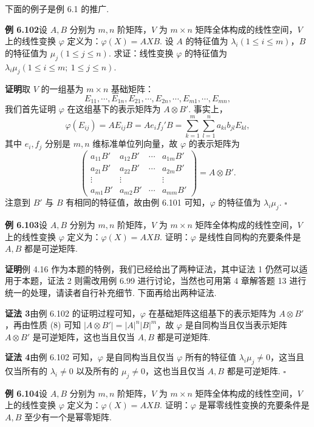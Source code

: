\documentclass[UTF8, 12pt, fontset=fandol, oneside]{ctexart}
\begin{document}
下面的例子是例 6.1 的推广.

\noindent\textbf{例 6.102}\quad 设 $A,B$ 分别为 $m,n$ 阶矩阵，$V$ 为 $m\times n$ 矩阵全体构成的线性空间，$V$ 上的线性变换 $\varphi$ 定义为：$\varphi(X)=AXB$. 设 $A$ 的特征值为 $\lambda_i(1\le i\le m)$，$B$ 的特征值为 $\mu_j(1\le j\le n)$. 求证：线性变换 $\varphi$ 的特征值为 $\lambda_i\mu_j(1\le i\le m;\ 1\le j\le n)$.

\noindent\textbf{证明}\quad 取 $V$ 的一组基为 $m\times n$ 基础矩阵：
\[
E_{11},\cdots,E_{1n},E_{21},\cdots,E_{2n},\cdots,E_{m1},\cdots,E_{mn},
\]
我们首先证明 $\varphi$ 在这组基下的表示矩阵为 $A\otimes B'$. 事实上，
\[
\varphi(E_{ij})=AE_{ij}B=Ae_if_j'B=\sum_{k=1}^m\sum_{l=1}^n a_{ki}b_{jl}E_{kl},
\]
其中 $e_i,f_j$ 分别是 $m,n$ 维标准单位列向量，故 $\varphi$ 的表示矩阵为
\[
\begin{pmatrix}
a_{11}B'&a_{12}B'&\cdots&a_{1m}B'\\
a_{21}B'&a_{22}B'&\cdots&a_{2m}B'\\
\vdots&\vdots&&\vdots\\
a_{m1}B'&a_{m2}B'&\cdots&a_{mm}B'
\end{pmatrix}=A\otimes B'.
\]
注意到 $B'$ 与 $B$ 有相同的特征值，故由例 6.101 可知，$\varphi$ 的特征值为 $\lambda_i\mu_j$. $\square$

\noindent\textbf{例 6.103}\quad 设 $A,B$ 分别为 $m,n$ 阶矩阵，$V$ 为 $m\times n$ 矩阵全体构成的线性空间，$V$ 上的线性变换 $\varphi$ 定义为：$\varphi(X)=AXB$. 证明：$\varphi$ 是线性自同构的充要条件是 $A,B$ 都是可逆矩阵.

\noindent\textbf{证明}\quad 例 4.16 作为本题的特例，我们已经给出了两种证法，其中证法 1 仍然可以适用于本题，证法 2 则需改用例 6.99 进行讨论，当然也可用第 4 章解答题 13 进行统一的处理，请读者自行补充细节. 下面再给出两种证法.

\noindent\textbf{证法 3}\quad 由例 6.102 的证明过程可知，$\varphi$ 在基础矩阵这组基下的表示矩阵为 $A\otimes B'$，再由性质 (8) 可知 $|A\otimes B'|=|A|^n|B|^m$，故 $\varphi$ 是自同构当且仅当表示矩阵 $A\otimes B'$ 是可逆矩阵，这也当且仅当 $A,B$ 都是可逆矩阵.

\noindent\textbf{证法 4}\quad 由例 6.102 可知，$\varphi$ 是自同构当且仅当 $\varphi$ 所有的特征值 $\lambda_i\mu_j\ne 0$，这当且仅当所有的 $\lambda_i\ne 0$ 以及所有的 $\mu_j\ne 0$，这也当且仅当 $A,B$ 都是可逆矩阵. $\square$

\noindent\textbf{例 6.104}\quad 设 $A,B$ 分别为 $m,n$ 阶矩阵，$V$ 为 $m\times n$ 矩阵全体构成的线性空间，$V$ 上的线性变换 $\varphi$ 定义为：$\varphi(X)=AXB$. 证明：$\varphi$ 是幂零线性变换的充要条件是 $A,B$ 至少有一个是幂零矩阵.
\end{document}
